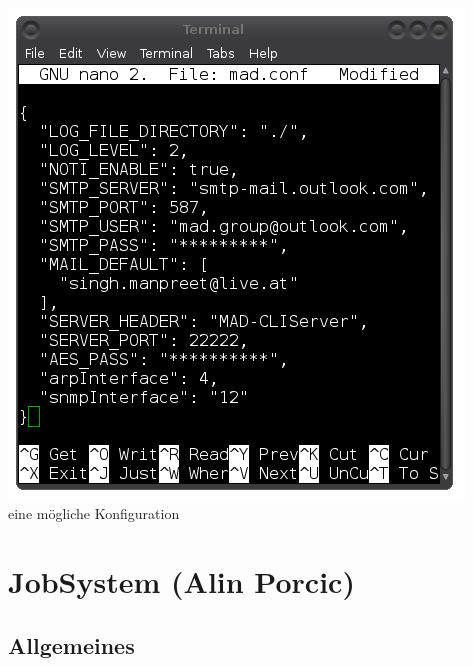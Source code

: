 \documentclass[12pt,a4paper]{report}
\begin{document}
\begin{onehalfspace}
\begin{center}
\includegraphics[scale=0.6]{img/madconf.png}\\
eine mögliche Konfiguration
\end{center}

\chapter{JobSystem (Alin Porcic)}

\section{Allgemeines}


\end{onehalfspace}
\end{document}
